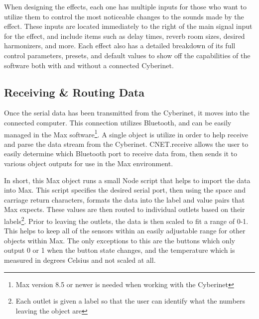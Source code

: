 When designing the effects, each one has multiple inputs for those who want to utilize them to control the most noticeable changes to the sounds made by the effect. These inputs are located immediately to the right of the main signal input for the effect, and include items such as delay times, reverb room sizes, desired harmonizers, and more. Each effect also has a detailed breakdown of its full control parameters, presets, and default values to show off the capabilities of the software both with and without a connected Cyberinet.

\subsection{Receiving \& Routing Data}

Once the serial data has been transmitted from the Cyberinet, it moves into the connected computer. This connection utilizes Bluetooth, and can be easily managed in the Max software\footnote{Max version 8.5 or newer is needed when working with the Cyberinet}. A single object is utilize in order to help receive and parse the data stream from the Cyberinet. CNET.receive allows the user to easily determine which Bluetooth port to receive data from, then sends it to various object outputs for use in the Max environment.


In short, this Max object runs a small Node script that helps to import the data into Max. This script specifies the desired serial port, then using the space and carriage return characters, formats the data into the label and value pairs that Max expects. These values are then routed to individual outlets based on their labels\footnote{Each outlet is given a label so that the user can identify what the numbers leaving the object are}. Prior to leaving the outlets, the data is then scaled to fit a range of 0-1. This helps to keep all of the sensors within an easily adjustable range for other objects within Max. The only exceptions to this are the buttons which only output 0 or 1 when the button state changes, and the temperature which is measured in degrees Celsius and not scaled at all. 

